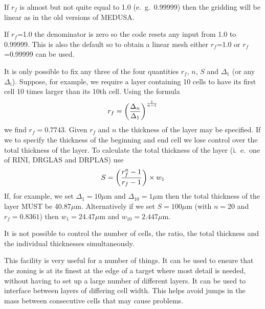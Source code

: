If $r_f$ is almost but not quite equal to 1.0 (e.\ g.\
0.99999) then the
gridding will be linear as in the old versions of MEDUSA.
 
If  $r_f$=1.0 the denominator is zero so the
code resets any input from 1.0 to 0.99999. This is also the
default so to obtain a linear mesh either $r_f$=1.0 or $r_f$=0.99999
can be used.
 
It is only possible to fix any three of the four quantities $r_f$,
$n$, $S$ and $\Delta_1$ (or any $\Delta_i$).
Suppose, for example, we require a layer containing 10
cells to have its first cell 10 times larger than its 10th cell. Using
the formula
$$r_f = \left( {\Delta_n \over \Delta_1 }\right)^{{1\over n-1}} $$
we find $r_f=0.7743$. Given $r_f$ and $n$ the thickness
of the layer may be specified. If we to specify the
thickness of the beginning and end cell
we lose control over the total thickness
of the layer. To calculate the total thickness of the layer (i.\ e.\ one
of RINI, DRGLAS and DRPLAS) use
$$ S = \left( {r_f^n -1 \over r_f -1} \right) \times w_1 $$
If, for example, we set $\Delta_1 = 10\mu$m and
$\Delta_{10}=1\mu$m then the total thickness of the layer
MUST be 40.87$\mu$m. Alternatively if we set
$S =  100\mu$m (with $n = 20$ and $r_f =0.8361$)
then $w_1=24.47\mu$m and $w_{10}=2.447\mu$m.
 
It is not possible to control the number of cells,
the ratio, the total thickness and
the individual thicknesses simultaneously.
 
This facility is very useful for a number of things. It can be used to
ensure that the zoning is at its finest at the edge of a target where
most detail is needed, without having to set up a large number
of different layers. It can be used to interface between layers
of differing cell width. This helps avoid jumps in the mass between
consecutive cells that may cause problems.
\newpage
